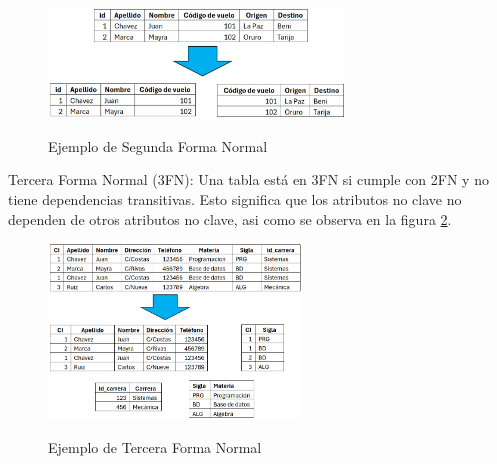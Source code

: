 		\begin{figure}[h] %
			\caption[Ejemplo 1FN]
			{\newline Ejemplo de Segunda Forma Normal} %
			\vspace{0.2cm}
			\centering
			\includegraphics[width=0.70\textwidth]{imagenes/normalizacion/2FN.png} %
			\vspace{0.3cm}
			\vspace{-0.6cm}
			\label{fig:figura_2FN} %
		\end{figure}
		
		Tercera Forma Normal (3FN): Una tabla está en 3FN si cumple con 2FN y no tiene dependencias transitivas. Esto significa que los atributos no clave no dependen de otros atributos no clave, asi como se observa en la figura \ref{fig:figura_3FN}.
		
		\vspace{0.3cm} %
		
		\begin{figure}[h] %
			\caption[Ejemplo 1FN]
			{\newline Ejemplo de Tercera Forma Normal} %
			\vspace{0.2cm}
			\centering
			\includegraphics[width=0.6\textwidth]{imagenes/normalizacion/3FN.png} %
			\vspace{0.3cm}
			\vspace{-0.6cm}
			\label{fig:figura_3FN} %
		\end{figure}
		
